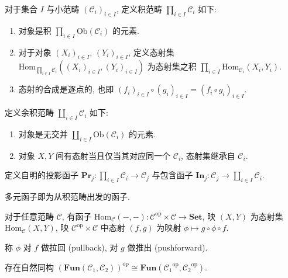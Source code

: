 \begin{definition}
    对于集合 \(I\) 与小范畴 \({(\mathcal{C}_i)}_{i \in I}\), 定义积范畴 \(\prod_{i \in I} \mathcal{C}_i\) 如下:

    \begin{enumerate}
        \item 对象是积 \(\prod_{i \in I} \mathrm{Ob} (\mathcal{C}_i)\) 的元素.
        \item 对于对象 \((X_i)_{i \in I}\), \((Y_i)_{i \in I}\), 定义态射集 \(\mathrm{Hom}_{\prod_{i \in I} \mathcal{C}_i} ((X_i)_{i \in I},(Y_i)_{i \in I})\) 为态射集之积
                \(\prod_{i \in I} \mathrm{Hom}_{\mathcal{C}_i} (X_i,Y_i)\).
        \item 态射的合成是逐点的, 也即 \({(f_i)}_{i \in I} \circ {(g_i)}_{i \in I} = {(f_i \circ g_i)}_{i \in I}\).
    \end{enumerate}

    定义余积范畴 \(\coprod_{i \in I} \mathcal{C}_i\) 如下:

    \begin{enumerate}
        \item 对象是无交并 \(\coprod_{i \in I} \mathrm{Ob} (\mathcal{C}_i)\) 的元素.
        \item 对象 \(X,Y\) 间有态射当且仅当其对应同一个 \(\mathcal{C}_i\), 态射集继承自 \(\mathcal{C}_i\).
    \end{enumerate}

    定义自明的投影函子 \(\mathbf{Pr}_j : \prod_{i \in I} \mathcal{C}_i \to \mathcal{C}_j\) 与包含函子 \(\mathbf{In}_j : \mathcal{C}_j \to \coprod_{i \in I} \mathcal{C}_i\).
\end{definition}

\begin{definition}
    多元函子即为从积范畴出发的函子.
\end{definition}

\begin{definition}[Hom 函子]
    对于任意范畴 \(\mathcal{C}\), 有函子 \(\mathrm{Hom}_{\mathcal{C}} (-,-) : \mathcal{C}^{\mathrm{op}} \times \mathcal{C} \to \mathbf{Set}\), 映 \((X,Y)\) 为态射集 \(\mathrm{Hom}_{\mathcal{C}} (X,Y)\), 
    映 \(\mathcal{C}^{\mathrm{op}} \times \mathcal{C}\) 中态射 \((f,g)\) 为映射 \(\phi \mapsto g \circ \phi \circ f\).

    称 \(\phi\) 对 \(f\) 做拉回 (pullback), 对 \(g\) 做推出 (pushforward).
\end{definition}

\begin{lemma}
    存在自然同构 \({(\mathbf{Fun} (\mathcal{C}_1 ,\mathcal{C}_2))}^\mathrm{op} \cong \mathbf{Fun} ({\mathcal{C}_1}^\mathrm{op}, {\mathcal{C}_2}^\mathrm{op})\).
\end{lemma}

